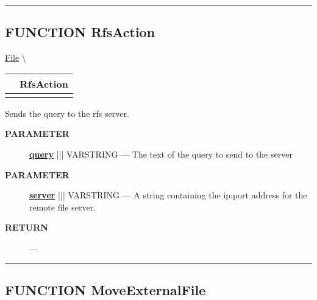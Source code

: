 \rule{\linewidth}{0.5pt}
\subsection*{\textsf{\colorbox{headtoc}{\color{white} FUNCTION}
RfsAction}}

\hypertarget{ecldoc:file.rfsaction}{}
\hspace{0pt} \hyperlink{ecldoc:File}{File} \textbackslash 

{\renewcommand{\arraystretch}{1.5}
\begin{tabularx}{\textwidth}{|>{\raggedright\arraybackslash}l|X|}
\hline
\hspace{0pt}\mytexttt{\color{red} } & \textbf{RfsAction} \\
\hline
\multicolumn{2}{|>{\raggedright\arraybackslash}X|}{\hspace{0pt}\mytexttt{\color{param} (varstring server, varstring query)}} \\
\hline
\end{tabularx}
}

\par





Sends the query to the rfs server.






\par
\begin{description}
\item [\colorbox{tagtype}{\color{white} \textbf{\textsf{PARAMETER}}}] \textbf{\underline{query}} ||| VARSTRING --- The text of the query to send to the server
\item [\colorbox{tagtype}{\color{white} \textbf{\textsf{PARAMETER}}}] \textbf{\underline{server}} ||| VARSTRING --- A string containing the ip:port address for the remote file server.
\end{description}







\par
\begin{description}
\item [\colorbox{tagtype}{\color{white} \textbf{\textsf{RETURN}}}] \textbf{} --- 
\end{description}




\rule{\linewidth}{0.5pt}
\subsection*{\textsf{\colorbox{headtoc}{\color{white} FUNCTION}
MoveExternalFile}}

